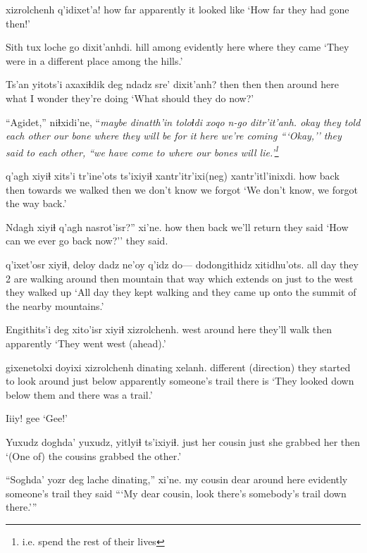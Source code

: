 \documentclass[12pt]{article}
\begin{document}
 xizrolchenh q'idixet'a!
{how far} apparently {it looked like}
\glt `How far they had gone then!'
\glend

\gll Sith tux loche go dixit'anhdi.
hill among evidently here {where they came}
\glt `They were in a different place among the hills.'
\glend

\gll Ts'an yitots'i axaxiɬdik deg ndadz sre' dixit'anh?
then then then {around here} what {I wonder} {they're doing}
\glt `What should they do now?'
\glend

\gll ``Agidet,'' niɬxidi'ne, ``\em maybe dinatth'in toloɬdi xoqo n-go ditr'it'anh.
okay {they told each other} {} {our bone} {where they will be} {for it} here {we're coming}
\glt ```Okay,'' they said to each other, ``we have come to where our bones will lie.'\footnote{i.e. spend the rest of their lives}
\glend

 q'agh xiyiɬ xits'i tr'ine'ots ts'ixiyiɬ xantr'itr'ixi(neg) xantr'itl'inixdi.
how back then towards {we walked} then {we don't know} {we forgot}
\glt `We don't know, we forgot the way back.'
\glend

\gll Ndagh xiyiɬ q'agh nasrot'isr?'' xi'ne.
how then back {we'll return} {they said}
\glt `How can we ever go back now?'' they said. 
\glend

 q'ixet'osr xiyiɬ, deloy dadz ne'oy q'idz do--- dodongithidz xitidhu'ots.
{all day} {they 2 are walking around} then mountain {that way} {which extends} on {} {just to the west} {they walked up}
\glt `All day they kept walking and they came up onto the summit of the nearby mountains.'
\glend

\gll Engithits'i deg xito'isr xiyiɬ xizrolchenh.
west {around here} {they'll walk} then apparently
\glt `They went west (ahead).'
\glend

 gixenetolxi doyixi xizrolchenh dinating xelanh.
{different (direction)} {they started to look around} {just below} apparently {someone's trail} {there is}
\glt `They looked down below them and there was a trail.'
\glend

\gll Iiiy!
gee
\glt `Gee!'
\glend

\gll Yuxudz doghda' yuxudz, yitlyiɬ ts'ixiyiɬ.
just {her cousin} just {she grabbed her} then
\glt `(One of) the cousins grabbed the other.'
\glend

\gll ``Soghda' yozr deg lache dinating,'' xi'ne.
{my cousin} dear {around here} evidently {someone's trail}  {they said}
\glt ```My dear cousin, look there's somebody's trail down there.'''
\glend
\end{document}
